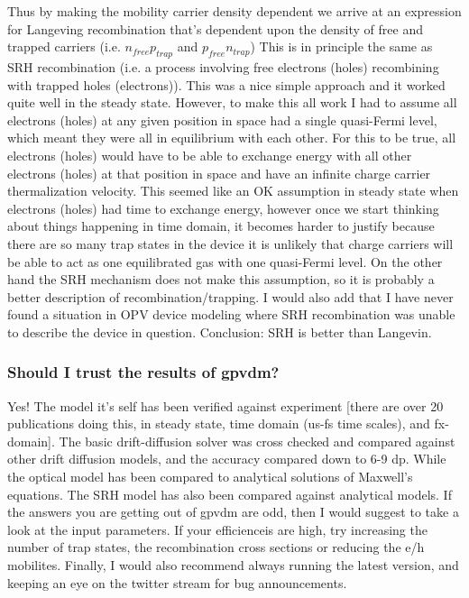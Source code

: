 \documentclass[11pt]{article}
\begin{document}
Thus by making the mobility carrier density dependent we arrive at an expression for Langeving recombination that's dependent upon the density of free and trapped carriers (i.e. $n_{free} p_{trap}$ and $ p_{free} n_{trap}$) This is in principle the same as SRH recombination (i.e. a process involving free electrons (holes) recombining with trapped holes (electrons)).  This was a nice simple approach and it worked quite well in the steady state.  However, to make this all work I had to assume all electrons (holes) at any given position in space had a single quasi-Fermi level, which meant they were all in equilibrium with each other.  For this to be true, all electrons (holes) would have to be able to exchange energy with all other electrons (holes) at that position in space and have an infinite charge carrier thermalization velocity.  This seemed like an OK assumption in steady state when electrons (holes) had time to exchange energy, however once we start thinking about things happening in time domain, it becomes harder to justify because there are so many trap states in the device it is unlikely that charge carriers will be able to act as one equilibrated gas with one quasi-Fermi level.  On the other hand the SRH mechanism does not make this assumption, so it is probably a better description of recombination/trapping.  I would also add that I have never found a situation in OPV device modeling where SRH recombination was unable to describe the device in question.  Conclusion: SRH is better than Langevin.  


\subsubsection{Should I trust the results of gpvdm?}
Yes!  The model it's self has been verified against experiment [there are over 20 publications doing this, in steady state, time domain (us-fs time scales), and fx-domain]. The basic drift-diffusion solver was cross checked and compared against other drift diffusion models, and the accuracy compared down to 6-9 dp.  While the optical model has been compared to analytical solutions of Maxwell's equations.  The SRH model has also been compared against analytical models.  If the answers you are getting out of gpvdm are odd, then I would suggest to take a look at the input parameters.  If your efficienceis are high, try increasing the number of trap states, the recombination cross sections or reducing the e/h mobilites.  Finally, I would also recommend always running the latest version, and keeping an eye on the twitter stream for bug announcements.
\end{document}
